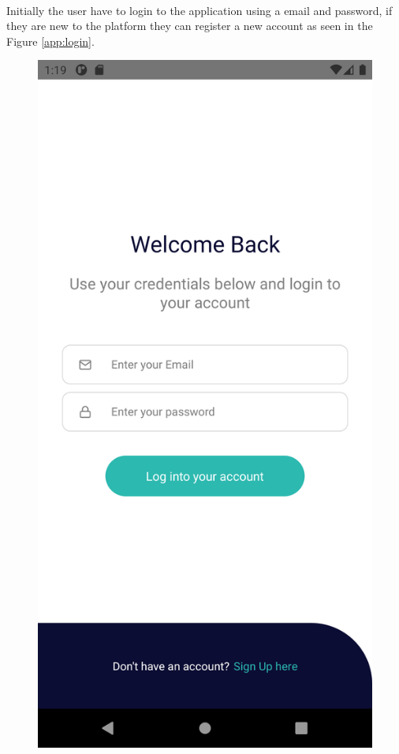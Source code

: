 \documentclass{article}
\begin{document}
        \paragraph{}
        Initially the user have to login to the application using a email and password, if they are new to the platform they can register a new account as seen in the Figure \ref{app:login}.
        \begin{figure}
            \centering
            \includegraphics[scale=0.1]{app_login}

\end{figure}
\end{document}
